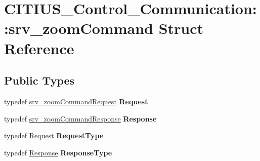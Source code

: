 \hypertarget{struct_c_i_t_i_u_s___control___communication_1_1srv__zoom_command}{\section{\-C\-I\-T\-I\-U\-S\-\_\-\-Control\-\_\-\-Communication\-:\-:srv\-\_\-zoom\-Command \-Struct \-Reference}
\label{struct_c_i_t_i_u_s___control___communication_1_1srv__zoom_command}
}
\subsection*{\-Public \-Types}
\begin{DoxyCompactItemize}
\item 
\hypertarget{struct_c_i_t_i_u_s___control___communication_1_1srv__zoom_command_af10ad23b6689d5998a0b1078d8252574}{typedef \hyperlink{struct_c_i_t_i_u_s___control___communication_1_1srv__zoom_command_request__}{srv\-\_\-zoom\-Command\-Request} {\bfseries \-Request}}\label{struct_c_i_t_i_u_s___control___communication_1_1srv__zoom_command_af10ad23b6689d5998a0b1078d8252574}

\item 
\hypertarget{struct_c_i_t_i_u_s___control___communication_1_1srv__zoom_command_a09c15fee317ab9c77727df00f82b74b6}{typedef \hyperlink{struct_c_i_t_i_u_s___control___communication_1_1srv__zoom_command_response__}{srv\-\_\-zoom\-Command\-Response} {\bfseries \-Response}}\label{struct_c_i_t_i_u_s___control___communication_1_1srv__zoom_command_a09c15fee317ab9c77727df00f82b74b6}

\item 
\hypertarget{struct_c_i_t_i_u_s___control___communication_1_1srv__zoom_command_a8d38beec2ce0dc79ae51ddab1f0006dd}{typedef \hyperlink{struct_c_i_t_i_u_s___control___communication_1_1srv__zoom_command_request__}{\-Request} {\bfseries \-Request\-Type}}\label{struct_c_i_t_i_u_s___control___communication_1_1srv__zoom_command_a8d38beec2ce0dc79ae51ddab1f0006dd}

\item 
\hypertarget{struct_c_i_t_i_u_s___control___communication_1_1srv__zoom_command_a491d597ccc1aac7ea53738f70b78ab0f}{typedef \hyperlink{struct_c_i_t_i_u_s___control___communication_1_1srv__zoom_command_response__}{\-Response} {\bfseries \-Response\-Type}}\label{struct_c_i_t_i_u_s___control___communication_1_1srv__zoom_command_a491d597ccc1aac7ea53738f70b78ab0f}

\end{DoxyCompactItemize}
